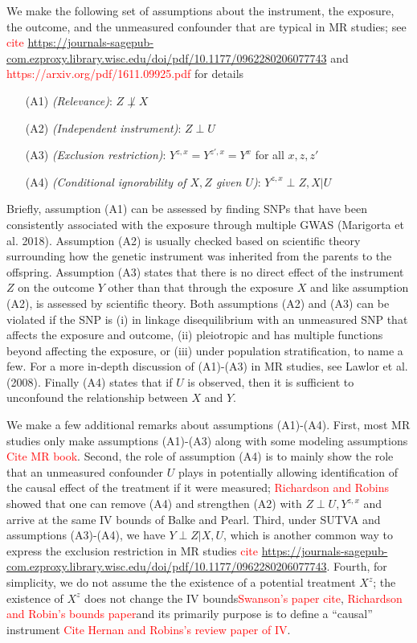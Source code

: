 \documentclass[
]{article}
\providecommand{\tightlist}{%
  \setlength{\itemsep}{0pt}\setlength{\parskip}{0pt}}
\theoremstyle{plain}
\begin{document}
We make the following set of assumptions about the instrument, the exposure, the outcome, and the unmeasured confounder that are typical in MR studies; see \textcolor{red}{cite \url{https://journals-sagepub-com.ezproxy.library.wisc.edu/doi/pdf/10.1177/0962280206077743}} and \textcolor{red}{https://arxiv.org/pdf/1611.09925.pdf} for details
\begin{itemize}
\tightlist
\item[(A1)] \emph{(Relevance)}: $Z \not\perp X$ 
\item[(A2)] \emph{(Independent instrument)}: $Z \perp U$
\item[(A3)] \emph{(Exclusion restriction)}: $Y^{z,x} = Y^{z',x} = Y^{x}$ for all $x,z,z'$
\item[(A4)]  \emph{(Conditional ignorability of $X,Z$ given $U$)}: $Y^{z,x} \perp Z, X | U$
\end{itemize}
Briefly, assumption (A1) can be assessed by finding SNPs that have been consistently associated with the exposure through multiple GWAS (Marigorta et al. 2018). Assumption (A2) is usually checked based on scientific theory surrounding how the genetic instrument was inherited from the parents to the offspring. Assumption (A3) states that there is no direct effect of the instrument \(Z\) on the outcome \(Y\) other than that through the exposure \(X\) and like assumption (A2), is assessed by scientific theory. Both assumptions (A2) and (A3) can be violated if the SNP is (i) in linkage disequilibrium with an unmeasured SNP that affects the exposure and outcome, (ii) pleiotropic and has multiple functions beyond affecting the exposure, or (iii) under population stratification, to name a few. For a more in-depth discussion of (A1)-(A3) in MR studies, see Lawlor et al. (2008). Finally (A4) states that if $U$ is observed, then it is sufficient to unconfound the relationship between $X$ and $Y$. 

We make a few additional remarks about assumptions (A1)-(A4). First, most MR studies only make assumptions (A1)-(A3) along with some modeling assumptions \textcolor{red}{Cite MR book}. Second, the role of assumption (A4) is to mainly show the role that an unmeasured confounder $U$ plays in potentially allowing identification of the causal effect of the treatment if it were measured; \textcolor{red}{Richardson and Robins} showed that one can remove (A4) and strengthen (A2) with $Z \perp U, Y^{z,x}$ and arrive at the same IV bounds of Balke and Pearl. Third, under SUTVA and assumptions (A3)-(A4), we have $Y \perp Z | X, U$, which is another common way to express the exclusion restriction in MR studies \textcolor{red}{cite \url{https://journals-sagepub-com.ezproxy.library.wisc.edu/doi/pdf/10.1177/0962280206077743}}. Fourth, for simplicity, we do not assume the the existence of a potential treatment $X^{z}$; the existence of $X^z$ does not change the IV bounds\textcolor{red}{Swanson's paper cite}, \textcolor{red}{Richardson and Robin's bounds paper}and its primarily purpose is to define a ``causal'' instrument \textcolor{red}{Cite Hernan and Robins's review paper of IV}.
\end{document}
